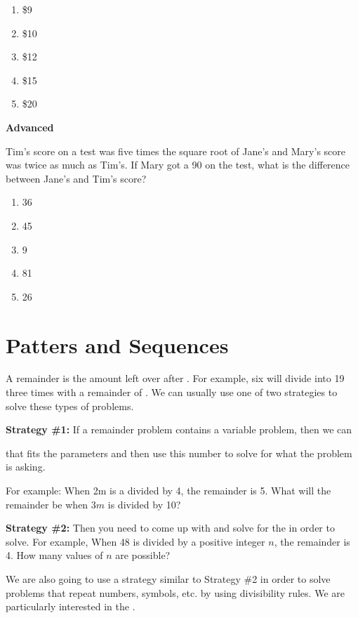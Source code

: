 \documentclass[12pt]{book}
\newcommand{\longline}{\underline{\hspace{2in}} }
\newcommand{\advanced}{\textbf{Advanced} }
\begin{document}
\begin{multienumerate}
{\begin{enumerate}[label=(\Alph*)]
\item \$9
\item \$10
\item \$12
\item \$15
\item \$20
\end{enumerate}}{\advanced

Tim's score on a test was five times the square root of Jane's and Mary's score was twice as much as Tim's. If Mary got a 90 on the test, what is the difference between Jane's and Tim's score?

\begin{enumerate}[label=(\Alph*)]
\item 36
\item 45
\item 9
\item 81
\item 26
\end{enumerate}}
\end{multienumerate}

\newpage
\section{Patters and Sequences}

A remainder is the amount left over after \longline. For example, six will divide into 19 three times with a remainder of \longline.
We can usually use one of two strategies to solve these types of problems.

\vfill
\textbf{Strategy \#1:} If a remainder problem contains a variable problem, then we can

\longline that fits the parameters and then use this number to solve for what the problem is asking. 

\bigskip
For example: When 2m is a divided by 4, the remainder is 5. What will the remainder be when $3m$ is divided by 10?

\vfill
\textbf{Strategy \#2:} Then you need to come up with \longline and solve for the \longline in order to solve. 
For example, When 48 is divided by a positive integer $n$, the remainder is 4. How many values of $n$ are possible?

\vfill
We are also going to use a strategy similar to Strategy \#2 in order to solve problems that repeat numbers, symbols, etc. by using divisibility rules. We are particularly interested in the  \longline.
\end{document}
